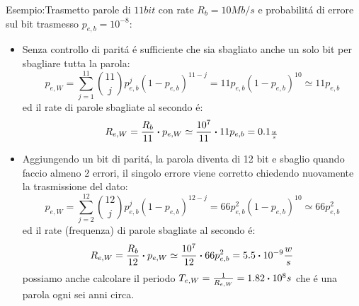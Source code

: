         Esempio:Trasmetto parole di $11bit$ con rate $R_b = 10Mb/s$ e probabilitá di errore sul bit trasmesso $p_{e,b} = 10^{-8}$:
        \begin{itemize}
            \item {
                Senza controllo di paritá é sufficiente che sia sbagliato anche un solo bit per sbagliare tutta la parola:
                \[
                    p_{e,W} = \sum_{j=1}^{11} \binom{11}{j}p_{e,b}^j (1-p_{e,b})^{11-j} = 11 p_{e,b} (1-p_{e,b})^{10} \simeq 11p_{e,b}
                \]
                ed il rate di parole sbagliate al secondo é:
                \[
                    R_{e,W} = \frac{R_b}{11}\dotproduct p_{e,W} \simeq \frac{10^7}{11}\dotproduct 11p_{e,b} = 0.1_\frac{w}{s}
                \]
            }
            \item {
                Aggiungendo un bit di paritá, la parola diventa di 12 bit e sbaglio quando faccio almeno 2 errori, il singolo errore
                viene corretto chiedendo nuovamente la trasmissione del dato:
                \[
                    p_{e,W} = \sum_{j=2}^{12} \binom{12}{j}p_{e,b}^j (1-p_{e,b})^{12-j} = 66 p_{e,b}^2 (1-p_{e,b})^{10} \simeq 66p_{e,b}^2
                \]
                ed il rate (frequenza) di parole sbagliate al secondo é:
                \[
                    R_{e,W} = \frac{R_b}{12}\dotproduct p_{e,W} \simeq \frac{10^7}{12}\dotproduct 66p_{e,b}^2 = 5.5\dotproduct 10^{-9} \frac{w}{s}
                \]
                possiamo anche calcolare il periodo $T_{e,W} = \frac{1}{R_{e,W}} =  1.82\dotproduct 10^{8} s$ che é una parola ogni sei anni circa.  
            }
        \end{itemize}
